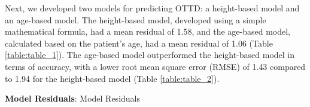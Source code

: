 \documentclass[11pt]{article}
\begin{document}
\begin{table}[h]
\caption{Average and standard deviation of height and age stratified by sex}
\label{table:table_0}
\begin{threeparttable}
\renewcommand{\TPTminimum}{\linewidth}
\begin{tablenotes}
\footnotesize
\item 
\end{tablenotes}
\end{threeparttable}
\end{table}


Next, we developed two models for predicting OTTD: a height-based model and an age-based model. The height-based model, developed using a simple mathematical formula, had a mean residual of 1.58, and the age-based model, calculated based on the patient's age, had a mean residual of 1.06 (Table {}\ref{table:table_1}). The age-based model outperformed the height-based model in terms of accuracy, with a lower root mean square error (RMSE) of 1.43 compared to 1.94 for the height-based model (Table {}\ref{table:table_2}).

\begin{table}[h]
\caption{Mean and standard deviation of residuals}
\label{table:table_1}
\begin{threeparttable}
\renewcommand{\TPTminimum}{\linewidth}
\begin{tablenotes}
\footnotesize
\item \textbf{Model Residuals}: Model Residuals
\end{tablenotes}
\end{threeparttable}
\end{table}
\end{document}
